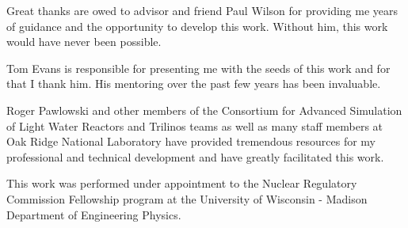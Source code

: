 Great thanks are owed to advisor and friend Paul Wilson for providing
me years of guidance and the opportunity to develop this work. Without
him, this work would have never been possible.

Tom Evans is responsible for presenting me with the seeds of this work
and for that I thank him. His mentoring over the past few years has
been invaluable.

Roger Pawlowski and other members of the Consortium for Advanced
Simulation of Light Water Reactors and Trilinos teams as well as many
staff members at Oak Ridge National Laboratory have provided
tremendous resources for my professional and technical development and
have greatly facilitated this work.

This work was performed under appointment to the Nuclear Regulatory
Commission Fellowship program at the University of Wisconsin - Madison
Department of Engineering Physics.
